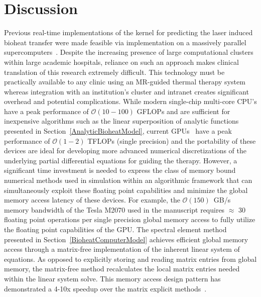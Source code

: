 \documentclass[12pt]{article}
\begin{document}
\section{Discussion}
{\color{blue}
Previous real-time implementations of the kernel for
predicting the laser induced bioheat transfer were made feasible via
implementation on a massively parallel supercomputers~\cite{fuentesetal09,
Odenetal07,Dilleretal07,Fengetal07,Fuentesetal08}. 
Despite the increasing presence of large computational clusters within
large academic hospitals, reliance on such an approach makes clinical
translation of this research extremely difficult. This technology must
be practically available to any clinic using an MR-guided thermal therapy
system whereas integration with an institution's cluster and intranet creates
significant overhead and potential complications.
While modern single-chip multi-core CPU's have a peak performance of
$\mathcal{O}(10-100)$ GFLOPs and are sufficient 
for inexpensive algorithms such as the linear superposition of analytic functions presented
in Section~\ref{AnalyticBioheatModel}, 
current GPUs~\cite{Farber2011a,Muller2013} have a peak
performance of $\mathcal{O}(1-2)$ TFLOPs (single precision) and the
portability of these devices are ideal for developing more advanced 
numerical discretizations of the underlying partial differential equations
for guiding the therapy. However, a significant
time investment is needed to express the class of memory bound numerical
methods used in simulation within an algorithmic framework that can
simultaneously exploit these floating point capabilities and minimize the
global memory access latency of these devices.
For example, the $\mathcal{O} (150)$~GB/s memory bandwidth of the Tesla M2070
used in the manuscript requires $\approx$ 30 floating point operations per
single precision global memory access to fully utilize the floating point capabilities
of the GPU. 
The spectral element method presented in Section~\ref{BioheatComputerModel}
achieves efficient global memory access through a matrix-free
implementation of the inherent linear system of equations.
As opposed to explicitly storing and reading matrix entries
from global memory, the matrix-free method recalculates the local matrix entries
needed within the linear system solve.
This memory access design pattern has demonstrated a 4-10x speedup  over
the matrix explicit methods~\cite{Muller2013,Knepley_2_2013,Medina2014}.
}
\end{document}
